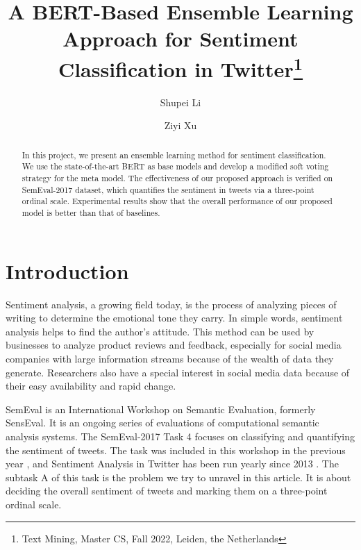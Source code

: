 \documentclass[runningheads]{llncs}
\begin{document}
%
\title{A BERT-Based Ensemble Learning Approach for Sentiment Classification in Twitter\thanks{Text Mining, Master CS, Fall 2022, Leiden, the Netherlands}}
%
%
\author{Shupei Li\and
Ziyi Xu}
%
%
%
\maketitle              %
%
\begin{abstract}
In this project, we present an ensemble learning method for sentiment classification. We use the state-of-the-art BERT as base models and develop a modified soft voting strategy for the meta model. The effectiveness of our proposed approach is verified on SemEval-2017 dataset, which quantifies the sentiment in tweets via a three-point ordinal scale. Experimental results show that the overall performance of our proposed model is better than that of baselines.

\end{abstract}
%
%
%
\section{Introduction}
Sentiment analysis, a growing field today, is the process of analyzing pieces of writing to determine the emotional tone they carry. In simple words, sentiment analysis helps to find the author's attitude. This method can be used by businesses to analyze product reviews and feedback, especially for social media companies with large information streams because of the wealth of data they generate. Researchers also have a special interest in social media data because of their easy availability and rapid change.

SemEval is an International Workshop on Semantic Evaluation, formerly SensEval. It is an ongoing series of evaluations of computational semantic analysis systems. The SemEval-2017 Task 4 focuses on classifying and quantifying the sentiment of tweets. The task was included in this workshop in the previous year \cite{nakov-etal-2016-semeval}, and Sentiment Analysis in Twitter has been run yearly since 2013 \cite{nakov-etal-2013-semeval}. The subtask A of this task is the problem we try to unravel in this article. It is about deciding the overall sentiment of tweets and marking them on a three-point ordinal scale.%
\end{document}
